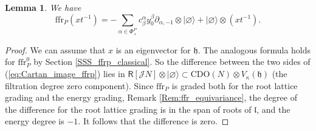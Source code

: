 \documentclass{amsart}
\newtheorem{Lem}[Thm]{Lemma}
\theoremstyle{definition}
\newcommand{\fl}{\mathfrak{l}}
\newcommand{\Ring}{\mathsf{R}}
\newcommand{\g}{\mathfrak{g}}
\newcommand{\gr}{\operatorname{gr}}
\newcommand{\h}{\mathfrak{h}}
\newcommand{\ffr}{\mathrm{ffr}}
\newcommand{\Jet}{\mathscr{J}}
\newcommand{\CDO}{\mathrm{CDO}}
\numberwithin{equation}{section}
\begin{document}
\begin{Lem}\label{Lem:ffr_Cartan_images}
We have 
\begin{equation}\label{eq:Cartan_image_ffrp}
\ffr_P(xt^{-1})=-\sum_{\alpha\in \Phi^P_+}c_\beta^\alpha y^\beta_0\partial_{\alpha,-1}\otimes |\varnothing\rangle+ |\varnothing\rangle\otimes (xt^{-1}).
\end{equation}
\end{Lem}
\begin{proof}
We can assume that $x$ is an eigenvector for $\h$.
The analogous formula holds for $\ffr_P^0$ by Section \ref{SSS_ffrp_classical}. So the difference between the two sides of (\ref{eq:Cartan_image_ffrp}) lies in 
$\Ring[\Jet N]\otimes |\varnothing\rangle\subset 
\CDO(N)\otimes V_\kappa(\h)$ (the filtration degree zero component). Since $\ffr_P$ is graded both for the root lattice grading and the energy grading, Remark \ref{Rem:ffr_equivariance}, 
the degree of the difference for the root lattice grading is in the span of roots of $\fl$, and the energy degree is $-1$.
It follows that the difference is zero. 
\end{proof}


\end{document}
